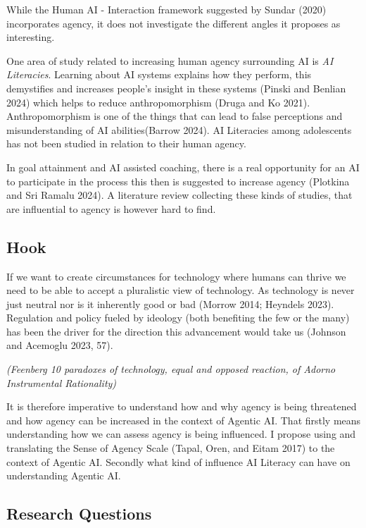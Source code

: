 \documentclass[
  letterpaper,
  DIV=11,
  numbers=noendperiod]{scrartcl}
\begin{document}
While the Human AI - Interaction framework suggested by Sundar (2020)
incorporates agency, it does not investigate the different angles it
proposes as interesting.

One area of study related to increasing human agency surrounding AI is
\emph{AI Literacies}. Learning about AI systems explains how they
perform, this demystifies and increases people's insight in these
systems (Pinski and Benlian 2024) which helps to reduce anthropomorphism
(Druga and Ko 2021). Anthropomorphism is one of the things that can lead
to false perceptions and misunderstanding of AI abilities(Barrow 2024).
AI Literacies among adolescents has not been studied in relation to
their human agency.

In goal attainment and AI assisted coaching, there is a real opportunity
for an AI to participate in the process this then is suggested to
increase agency (Plotkina and Sri Ramalu 2024). A literature review
collecting these kinds of studies, that are influential to agency is
however hard to find.

\subsection{Hook}\label{hook}

If we want to create circumstances for technology where humans can
thrive we need to be able to accept a pluralistic view of technology. As
technology is never just neutral nor is it inherently good or bad
(Morrow 2014; Heyndels 2023). Regulation and policy fueled by ideology
(both benefiting the few or the many) has been the driver for the
direction this advancement would take us (Johnson and Acemoglu 2023,
57).

\emph{(Feenberg 10 paradoxes of technology, equal and opposed reaction,
of Adorno Instrumental Rationality)}

It is therefore imperative to understand how and why agency is being
threatened and how agency can be increased in the context of Agentic AI.
That firstly means understanding how we can assess agency is being
influenced. I propose using and translating the Sense of Agency Scale
(Tapal, Oren, and Eitam 2017) to the context of Agentic AI. Secondly
what kind of influence AI Literacy can have on understanding Agentic AI.

\subsection{Research Questions}\label{research-questions}
\end{document}
